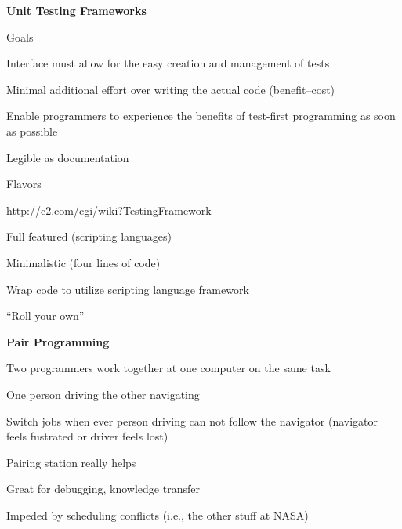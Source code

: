 \documentclass[landscape]{slides}
\renewcommand{\title}[1]{{\large\bfseries #1}}
\newenvironment{itemiz}%
  {\begin{list}{}{\raggedright
      \setlength{\itemsep}{2pt}%
      \setlength{\parskip}{4pt}\setlength{\parsep}{2pt}}}%
  {\end{list}}%
\begin{document}
 \begin{slide}
   \title{Unit Testing Frameworks}
   \begin{itemiz}
   \item Goals
     \begin{itemiz}
     \item Interface must allow for the easy creation and management of tests
     \item Minimal additional effort over writing the actual code
     (benefit--cost)
     \item Enable programmers to experience the benefits of test-first
       programming as soon as possible
     \item Legible as documentation
     \end{itemiz}
   \item Flavors
     \begin{itemiz}
     \item \url{http://c2.com/cgi/wiki?TestingFramework}
     \item Full featured (scripting languages)
     \item Minimalistic (four lines of code)
     \item Wrap code to utilize scripting language framework
     \item ``Roll your own''
     \end{itemiz}
   \end{itemiz}
 \end{slide}
 
 \begin{slide}
   \title{Pair Programming}
   \begin{itemiz}
   \item Two programmers work together at one computer on the same
     task
     \begin{itemiz}
     \item One person driving the other navigating
     \item Switch jobs when ever person driving can not follow the navigator
       (navigator feels fustrated or driver feels lost)
     \end{itemiz}
   \item Pairing station really helps
   \item Great for debugging, knowledge transfer
   \item Impeded by scheduling conflicts (i.e., the other stuff at NASA)
   \end{itemiz}
 \end{slide}
 
\end{document}
